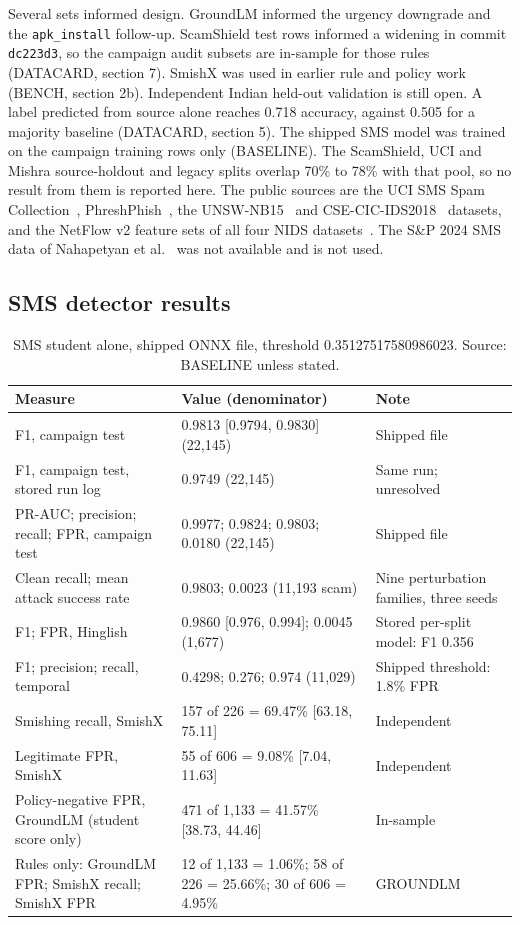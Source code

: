 Several sets informed design. GroundLM informed the urgency downgrade and the \texttt{apk\_install} follow-up. ScamShield test rows informed a widening in commit \texttt{dc223d3}, so the campaign audit subsets are in-sample for those rules (DATACARD, section 7). SmishX was used in earlier rule and policy work (BENCH, section 2b). Independent Indian held-out validation is still open. A label predicted from source alone reaches 0.718 accuracy, against 0.505 for a majority baseline (DATACARD, section 5). The shipped SMS model was trained on the campaign training rows only (BASELINE). The ScamShield, UCI and Mishra source-holdout and legacy splits overlap 70\% to 78\% with that pool, so no result from them is reported here. The public sources are the UCI SMS Spam Collection~\cite{ucisms}, PhreshPhish~\cite{phreshphish}, the UNSW-NB15~\cite{unswnb15} and CSE-CIC-IDS2018~\cite{cicids2018} datasets, and the NetFlow v2 feature sets of all four NIDS datasets~\cite{netflowv2}. The S\&P 2024 SMS data of Nahapetyan et al.~\cite{smishing} was not available and is not used.

\subsection{SMS detector results}

\begin{table}[t]
\centering
\caption{SMS student alone, shipped ONNX file, threshold 0.35127517580986023. Source: BASELINE unless stated.}\label{tab:sms}
\footnotesize
\setlength{\tabcolsep}{3pt}
\begin{tabularx}{\linewidth}{>{\raggedright\arraybackslash}p{5.3cm}Yp{3.3cm}}
\toprule
Measure & Value (denominator) & Note \\
\midrule
F1, campaign test & 0.9813 [0.9794, 0.9830] (22,145) & Shipped file \\
F1, campaign test, stored run log & 0.9749 (22,145) & Same run; unresolved \\
PR-AUC; precision; recall; FPR, campaign test & 0.9977; 0.9824; 0.9803; 0.0180 (22,145) & Shipped file \\
Clean recall; mean attack success rate & 0.9803; 0.0023 (11,193 scam) & Nine perturbation families, three seeds \\
F1; FPR, Hinglish  & 0.9860 [0.976, 0.994]; 0.0045 (1,677) & Stored per-split model: F1 0.356 \\
F1; precision; recall, temporal & 0.4298; 0.276; 0.974 (11,029) & Shipped threshold: 1.8\% FPR \\
Smishing recall, SmishX & 157 of 226 = 69.47\% [63.18, 75.11] & Independent \\
Legitimate FPR, SmishX & 55 of 606 = 9.08\% [7.04, 11.63] & Independent \\
Policy-negative FPR, GroundLM (student score only) & 471 of 1,133 = 41.57\% [38.73, 44.46] & In-sample \\
Rules only: GroundLM FPR; SmishX recall; SmishX FPR & 12 of 1,133 = 1.06\%; 58 of 226 = 25.66\%; 30 of 606 = 4.95\% & GROUNDLM \\
\bottomrule
\end{tabularx}
\end{table}

